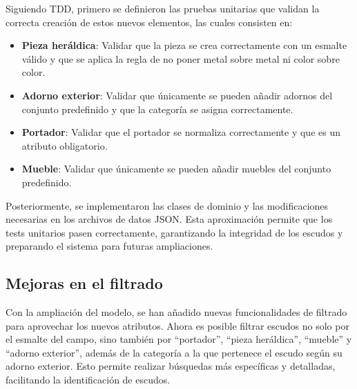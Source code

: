 Siguiendo TDD, primero se definieron las pruebas unitarias que validan la correcta creación de estos 
nuevos elementos, las cuales consisten en:

\begin{itemize}
    \item \textbf{Pieza heráldica}: Validar que la pieza se crea correctamente con un esmalte válido y que
    se aplica la regla de no poner metal sobre metal ni color sobre color.
    \item \textbf{Adorno exterior}: Validar que únicamente se pueden añadir adornos del conjunto predefinido
    y que la categoría se asigna correctamente.
    \item \textbf{Portador}: Validar que el portador se normaliza correctamente y que es un atributo obligatorio.
    \item \textbf{Mueble}: Validar que únicamente se pueden añadir muebles del conjunto predefinido.
\end{itemize}

Posteriormente, se implementaron las clases de dominio y las modificaciones necesarias en los archivos 
de datos JSON. Esta aproximación permite que los tests unitarios pasen correctamente, garantizando la 
integridad de los escudos y preparando el sistema para futuras ampliaciones.

\subsection{Mejoras en el filtrado}
Con la ampliación del modelo, se han añadido nuevas funcionalidades de filtrado para aprovechar los
nuevos atributos. Ahora es posible filtrar escudos no solo por el esmalte del campo, sino también por
``portador'', ``pieza heráldica'', ``mueble'' y ``adorno exterior'', además de la categoría a la que
pertenece el escudo según su adorno exterior. Esto permite realizar búsquedas más específicas y detalladas,
facilitando la identificación de escudos.

